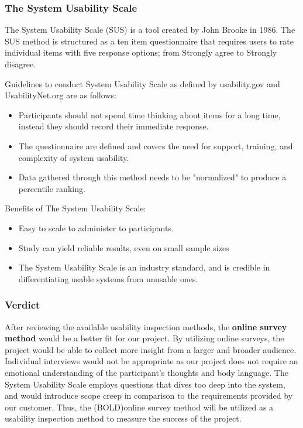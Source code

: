 \documentclass[10pt,journal,compsoc,draftclsnofoot]{IEEEtran}
\begin{document}
\subsubsection{The System Usability Scale ~\cite{userResearch}} 
The System Usability Scale (SUS) is a tool created by John Brooke in 1986.
The SUS method is structured as a ten item questionnaire that requires users to rate individual items with five response options; from Strongly agree to Strongly disagree.

Guidelines to conduct System Usability Scale as defined by usability.gov and UsabilityNet.org are as follows:
\begin{itemize}
\item Participants should not spend time thinking about items for a long time, instead they should record their immediate response. \cite{usabilitynet}
\item The questionnaire are defined and covers the need for support, training, and complexity of system usability.
\item Data gathered through this method needs to be "normalized" to produce a percentile ranking.
\end{itemize}

Benefits of The System Usability Scale:
\begin{itemize}
\item Easy to scale to administer to participants.
\item Study can yield reliable results, even on small sample sizes
\item The System Usability Scale is an industry standard, and is credible in differentiating usable systems from unusable ones.
\end{itemize}

\subsubsection{Verdict}
After reviewing the available usability inspection methods, the \textbf{online survey method} would be a better fit for our project.
By utilizing online surveys, the project would be able to collect more insight from a larger and broader audience.
Individual interviews would not be appropriate as our project does not require an emotional understanding of the participant's thoughts and body language.
The System Usability Scale employs questions that dives too deep into the system, and would introduce scope creep in comparison to the requirements provided by our customer.
Thus, the (BOLD)online survey method will be utilized as a usability inspection method to measure the success of the project.
\end{document}
